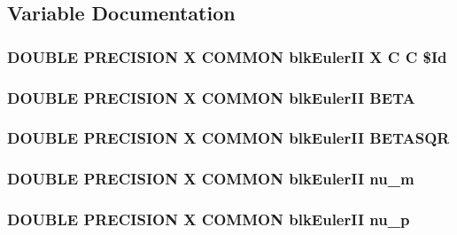 \subsection{Variable Documentation}
\hypertarget{blk_euler_i_i_8com_aee39e63378026ca0f2ad3d2269ba8617}{
\subsubsection[{\$\-Id}]{\setlength{\rightskip}{0pt plus 5cm}D\-O\-U\-B\-L\-E P\-R\-E\-C\-I\-S\-I\-O\-N X C\-O\-M\-M\-O\-N blk\-Euler\-I\-I X C C \$Id}}\label{blk_euler_i_i_8com_aee39e63378026ca0f2ad3d2269ba8617}
\hypertarget{blk_euler_i_i_8com_a41ef0ad0ee32dac89987c7180349fc65}{
\subsubsection[{B\-E\-T\-A}]{\setlength{\rightskip}{0pt plus 5cm}D\-O\-U\-B\-L\-E P\-R\-E\-C\-I\-S\-I\-O\-N X C\-O\-M\-M\-O\-N blk\-Euler\-I\-I B\-E\-T\-A}}\label{blk_euler_i_i_8com_a41ef0ad0ee32dac89987c7180349fc65}
\hypertarget{blk_euler_i_i_8com_ac0146ab866702996a794cadecf77eb99}{
\subsubsection[{B\-E\-T\-A\-S\-Q\-R}]{\setlength{\rightskip}{0pt plus 5cm}D\-O\-U\-B\-L\-E P\-R\-E\-C\-I\-S\-I\-O\-N X C\-O\-M\-M\-O\-N blk\-Euler\-I\-I B\-E\-T\-A\-S\-Q\-R}}\label{blk_euler_i_i_8com_ac0146ab866702996a794cadecf77eb99}
\hypertarget{blk_euler_i_i_8com_a98e43f19d876d2049e78b89adbf5a71d}{
\subsubsection[{nu\-\_\-m}]{\setlength{\rightskip}{0pt plus 5cm}D\-O\-U\-B\-L\-E P\-R\-E\-C\-I\-S\-I\-O\-N X C\-O\-M\-M\-O\-N blk\-Euler\-I\-I nu\-\_\-m}}\label{blk_euler_i_i_8com_a98e43f19d876d2049e78b89adbf5a71d}
\hypertarget{blk_euler_i_i_8com_ab283911b22384fef633cd41d154f3f2f}{
\subsubsection[{nu\-\_\-p}]{\setlength{\rightskip}{0pt plus 5cm}D\-O\-U\-B\-L\-E P\-R\-E\-C\-I\-S\-I\-O\-N X C\-O\-M\-M\-O\-N blk\-Euler\-I\-I nu\-\_\-p}}\label{blk_euler_i_i_8com_ab283911b22384fef633cd41d154f3f2f}
